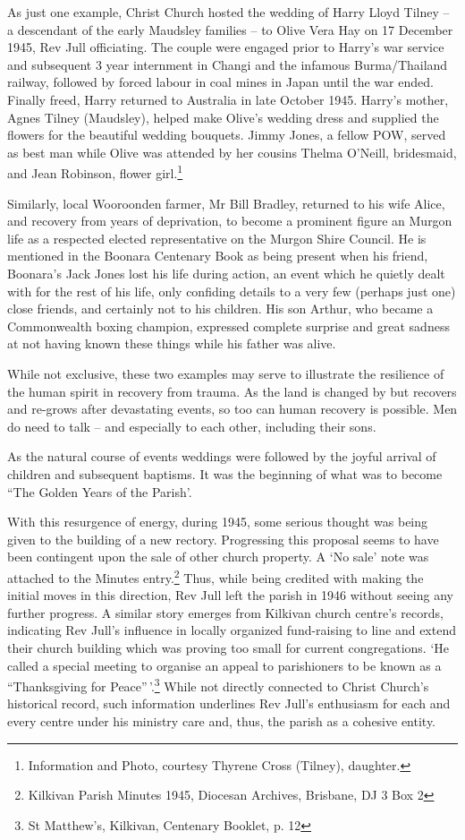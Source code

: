 As just one example, Christ Church hosted the wedding of Harry Lloyd
Tilney -- a descendant of the early Maudsley families -- to Olive Vera
Hay on 17 December 1945, Rev Jull officiating. The couple were engaged
prior to Harry's war service and subsequent 3  year internment in
Changi and the infamous Burma/Thailand railway, followed by forced
labour in coal mines in Japan until the war ended. Finally freed, Harry
returned to Australia in late October 1945. Harry's mother, Agnes Tilney
(Maudsley), helped make Olive's wedding dress and supplied the flowers
for the beautiful wedding bouquets. Jimmy Jones, a fellow POW, served as
best man while Olive was attended by her cousins Thelma O'Neill,
bridesmaid, and Jean Robinson, flower girl.\footnote{Information and
  Photo, courtesy Thyrene Cross (Tilney), daughter.}

Similarly, local Wooroonden farmer, Mr Bill Bradley, returned to his
wife Alice, and recovery from years of deprivation, to become a
prominent figure an Murgon life as a respected elected representative on
the Murgon Shire Council. He is mentioned in the Boonara Centenary Book
as being present when his friend, Boonara's Jack Jones lost his life
during action, an event which he quietly dealt with for the rest of his
life, only confiding details to a very few (perhaps just one) close
friends, and certainly not to his children. His son Arthur, who became a
Commonwealth boxing champion, expressed complete surprise and great
sadness at not having known these things while his father was alive.

While not exclusive, these two examples may serve to illustrate the
resilience of the human spirit in recovery from trauma. As the land is
changed by but recovers and re-grows after devastating events, so too
can human recovery is possible. Men do need to talk -- and especially to
each other, including their sons.

As the natural course of events weddings were followed by the joyful
arrival of children and subsequent baptisms. It was the beginning of
what was to become ``The Golden Years of the Parish'.

With this resurgence of energy, during 1945, some serious thought was
being given to the building of a new rectory. Progressing this proposal
seems to have been contingent upon the sale of other church property. A
`No sale' note was attached to the Minutes entry.\footnote{Kilkivan
  Parish Minutes 1945, Diocesan Archives, Brisbane, DJ 3 Box 2} Thus,
while being credited with making the initial moves in this direction,
Rev Jull left the parish in 1946 without seeing any further progress. A
similar story emerges from Kilkivan church centre's records, indicating
Rev Jull's influence in locally organized fund-raising to line and
extend their church building which was proving too small for current
congregations. `He called a special meeting to organise an appeal to
parishioners to be known as a ``Thanksgiving for Peace''\,'.\footnote{St
  Matthew's, Kilkivan, Centenary Booklet, p. 12} While not directly
connected to Christ Church's historical record, such information
underlines Rev Jull's enthusiasm for each and every centre under his
ministry care and, thus, the parish as a cohesive entity.

